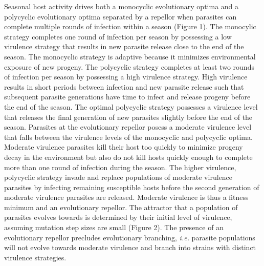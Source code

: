 \documentclass{article}
\begin{document}
Seasonal host activity drives both a monocyclic evolutionary optima and a polycyclic evolutionary optima separated by a repellor when parasites can complete multiple rounds of infection within a season (Figure 1). The monocylic strategy completes one round of infection per season by possessing a low virulence strategy that results in new parasite release close to the end of the season. The monocyclic strategy is adaptive because it minimizes environmental exposure of new progeny. The polycyclic strategy completes at least two rounds of infection per season by possessing a high virulence strategy. High virulence results in short periods between infection and new parasite release such that subsequent parasite generations have time to infect and release progeny before the end of the season. The optimal polycyclic strategy possesses a virulence level that releases the final generation of new parasites slightly before the end of the season. Parasites at the evolutionary repellor posess a moderate virulence level that falls between the virulence levels of the monocyclic and polycyclic optima. Moderate virulence parasites kill their host too quickly to minimize progeny decay in the environment but also do not kill hosts quickly enough to complete more than one round of infection during the season. The higher virulence, polycyclic strategy invade and replace populations of moderate virulence parasites by infecting remaining susceptible hosts before the second generation of moderate virulence parasites are released. Moderate virulence is thus a fitness minimum and an evolutionary repellor. The attractor that a population of parasites evolves towards is determined by their initial level of virulence, assuming mutation step sizes are small (Figure 2). The presence of an evolutionary repellor precludes evolutionary branching, \textit{i.e.} parasite populations will not evolve towards moderate virulence and branch into strains with distinct virulence strategies.
\end{document}
